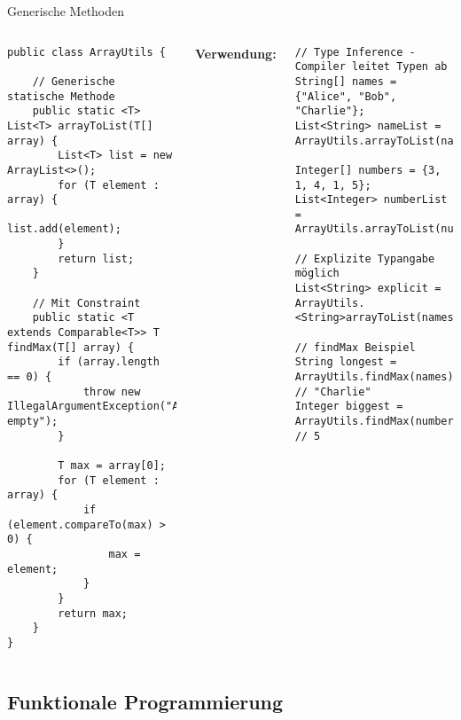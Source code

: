 \begin{frame}[fragile]{Generische Methoden}
  \begin{columns}[T]
    \begin{lstlisting}[style=java, basicstyle=\tiny\ttfamily]
public class ArrayUtils {

    // Generische statische Methode
    public static <T> List<T> arrayToList(T[] array) {
        List<T> list = new ArrayList<>();
        for (T element : array) {
            list.add(element);
        }
        return list;
    }

    // Mit Constraint
    public static <T extends Comparable<T>> T findMax(T[] array) {
        if (array.length == 0) {
            throw new IllegalArgumentException("Array empty");
        }

        T max = array[0];
        for (T element : array) {
            if (element.compareTo(max) > 0) {
                max = element;
            }
        }
        return max;
    }
}
    \end{lstlisting}

    \textbf{Verwendung:}
    \begin{lstlisting}[style=java, basicstyle=\tiny\ttfamily]
// Type Inference - Compiler leitet Typen ab
String[] names = {"Alice", "Bob", "Charlie"};
List<String> nameList = ArrayUtils.arrayToList(names);

Integer[] numbers = {3, 1, 4, 1, 5};
List<Integer> numberList = ArrayUtils.arrayToList(numbers);

// Explizite Typangabe möglich
List<String> explicit = ArrayUtils.<String>arrayToList(names);

// findMax Beispiel
String longest = ArrayUtils.findMax(names); // "Charlie"
Integer biggest = ArrayUtils.findMax(numbers); // 5
    \end{lstlisting}
  \end{columns}
\end{frame}


\subsection{Funktionale Programmierung}

